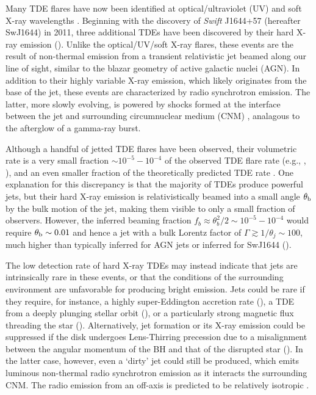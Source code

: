 \documentclass[usenatbib,fleqn]{mnras}
\begin{document}
Many TDE flares have now been identified at optical/ultraviolet (UV)
\citep{Gezari+2008, Gezari+2009, van-Velzen+2011, Gezari+2012,
  Arcavi+2014, Chornock+2014, Holoien+2014, Vinko+2015, Holoien+2016}
and soft X-ray wavelengths \citep{Bade+1996, Grupe+1999,
  Komossa&Greiner1999, Greiner+2000, Esquej+2007, Maksym+2010,
  Saxton+2012}. Beginning with the discovery of {\it Swift} J1644+57
(hereafter SwJ1644) in 2011, three additional TDEs have been
discovered by their hard X-ray emission (\citealt{Bloom+2011,
  Levan+2011, Burrows+2011, Zauderer+2011, Cenko+2012, Pasham+2015,
  Brown+2015}).  Unlike the optical/UV/soft X-ray flares, these
events are the result of non-thermal emission from a transient
relativistic jet beamed along our line of sight, similar to the blazar
geometry of active galactic nuclei (AGN).  In addition to their highly
variable X-ray emission, which likely originates from the base of the
jet, these events are characterized by radio synchrotron emission.
The latter, more slowly evolving, is powered by shocks formed at the
interface between the jet and surrounding circumnuclear medium (CNM)
\citep{Bloom+2011,Giannios&Metzger2011,Metzger+2012,De-Colle+2012,Mimica+2015},
analagous to the afterglow of a gamma-ray burst.

Although a handful of jetted TDE flares have been observed, their
volumetric rate is a very small fraction $\sim 10^{-5}-10^{-4}$ of the
observed TDE flare rate (e.g., \citealt{Burrows+2011},
\citealt{Brown+2015}), and an even smaller fraction of the
theoretically predicted TDE rate
\citep{Wang&Merritt2004,Stone&Metzger2016}.  One explanation
for this discrepancy is that the majority of TDEs produce powerful
jets, but their hard X-ray emission is relativistically beamed into a
small angle $\theta_{\rm b}$ by the bulk motion of the jet, making them visible to only a small
fraction of observers.  However, the inferred beaming fraction $f_b
\approx \theta_{b}^{2}/2 \sim 10^{-5}-10^{-4}$ would require
$\theta_{\rm b} \sim 0.01$ and hence a jet with a bulk Lorentz factor
of $\Gamma \gtrsim 1/\theta_j \sim 100$, much higher than typically
inferred for AGN jets or inferred for SwJ1644
(\citealt{Metzger+2012}).

The low detection rate of hard X-ray TDEs may instead indicate that
jets are intrinsically rare in these events, or that the conditions of the
surrounding environment are unfavorable for producing bright emission.
Jets could be rare if they require, for instance, a highly
super-Eddington accretion rate (\citealt{De-Colle+2012}), a TDE from a
deeply plunging stellar orbit (\citealt{Metzger&Stone2015}), or a
particularly strong magnetic flux threading the star
(\citealt{Tchekhovskoy+2014,Kelley+2014}).  Alternatively, jet formation
or its X-ray emission could be suppressed if the disk undergoes
Lens-Thirring precession due to a misalignment between the angular
momentum of the BH and that of the disrupted star
(\citealt{Stone&Loeb2012}).  In the latter case, however, even a `dirty'
jet could still be produced, which emits luminous non-thermal radio
synchrotron emission as it interacts the surrounding CNM.  The radio
emission from an off-axis is predicted to be relatively isotropic
\citep{Giannios&Metzger2011,Mimica+2015}.
\end{document}

